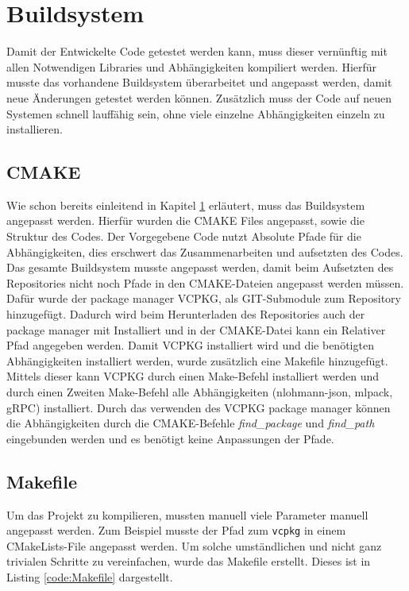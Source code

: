 \section{Buildsystem}
\label{sec:buildsystem}
Damit der Entwickelte Code getestet werden kann, muss dieser vernünftig mit allen Notwendigen Libraries und Abhängigkeiten kompiliert werden. Hierfür musste das vorhandene Buildsystem überarbeitet und angepasst werden, damit neue Änderungen getestet werden können. Zusätzlich muss der Code auf neuen Systemen schnell lauffähig sein, ohne viele einzelne Abhängigkeiten einzeln zu installieren.

\subsection{CMAKE}
\label{sec:cmake}
Wie schon bereits einleitend in Kapitel \ref{sec:buildsystem} erläutert, muss das Buildsystem angepasst werden. Hierfür wurden die CMAKE Files angepasst, sowie die Struktur des Codes. Der Vorgegebene Code nutzt Absolute Pfade für die Abhängigkeiten, dies erschwert das Zusammenarbeiten und aufsetzten des Codes. Das gesamte Buildsystem musste angepasst werden, damit beim Aufsetzten des Repositories nicht noch Pfade in den CMAKE-Dateien angepasst werden müssen. Dafür wurde der package manager VCPKG, als GIT-Submodule zum Repository hinzugefügt. Dadurch wird beim Herunterladen des Repositories auch der package manager mit Installiert und in der CMAKE-Datei kann ein Relativer Pfad angegeben werden. Damit VCPKG installiert wird und die benötigten Abhängigkeiten installiert werden, wurde zusätzlich eine Makefile hinzugefügt. Mittels dieser kann VCPKG durch einen Make-Befehl installiert werden und durch einen Zweiten Make-Befehl alle Abhängigkeiten (nlohmann-json, mlpack, gRPC) installiert. Durch das verwenden des VCPKG package manager können die Abhängigkeiten durch die CMAKE-Befehle \textit{find\_package} und \textit{find\_path} eingebunden werden und es benötigt keine Anpassungen der Pfade.

\subsection{Makefile}

Um das Projekt zu kompilieren, mussten manuell viele Parameter manuell angepasst werden. Zum Beispiel musste der Pfad zum \verb|vcpkg| in einem CMakeLists-File angepasst werden. Um solche umständlichen und nicht ganz trivialen Schritte zu vereinfachen, wurde das Makefile erstellt. Dieses ist in Listing \ref{code:Makefile} dargestellt.\\

